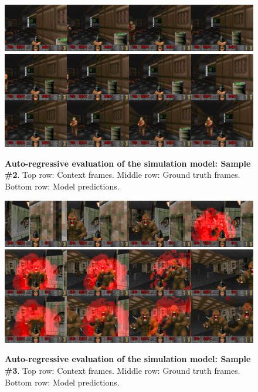 \documentclass{article} %
\begin{document}
\begin{figure}[h]
    \centering
    \includegraphics[width=1.0\textwidth]{figures/samples/context_3.png}
    \includegraphics[width=1.0\textwidth]{figures/samples/gt_vs_predicted_3.png}
    \caption{\textbf{Auto-regressive evaluation of the simulation model: Sample \#2}. Top row: Context frames. Middle row: Ground truth frames. Bottom row: Model predictions.}
    \label{fig:samples_2}
\end{figure}

\begin{figure}[h]
    \centering
    \includegraphics[width=1.0\textwidth]{figures/samples/context_5.png}
    \includegraphics[width=1.0\textwidth]{figures/samples/gt_vs_prediction_5.png}
    \caption{\textbf{Auto-regressive evaluation of the simulation model: Sample \#3}. Top row: Context frames. Middle row: Ground truth frames. Bottom row: Model predictions.}
    \label{fig:samples_3}
\end{figure}
\end{document}
